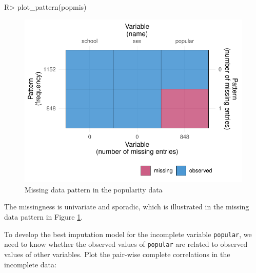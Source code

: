 \documentclass[
]{jss}
\begin{document}
\begin{CodeChunk}
\begin{CodeInput}
R> plot_pattern(popmis)
\end{CodeInput}
\begin{figure}

{\centering \includegraphics{Imputation_of_Incomplete_Multilevel_Data_files/figure-latex/pop_pat-1} 

}

\caption[Missing data pattern in the popularity data]{Missing data pattern in the popularity data}\label{fig:pop_pat}
\end{figure}
\end{CodeChunk}

The missingness is univariate and sporadic, which is illustrated in the
missing data pattern in Figure \ref{fig:pop_pat}.

To develop the best imputation model for the incomplete variable
\texttt{popular}, we need to know whether the observed values of
\texttt{popular} are related to observed values of other variables. Plot
the pair-wise complete correlations in the incomplete data:
\end{document}
